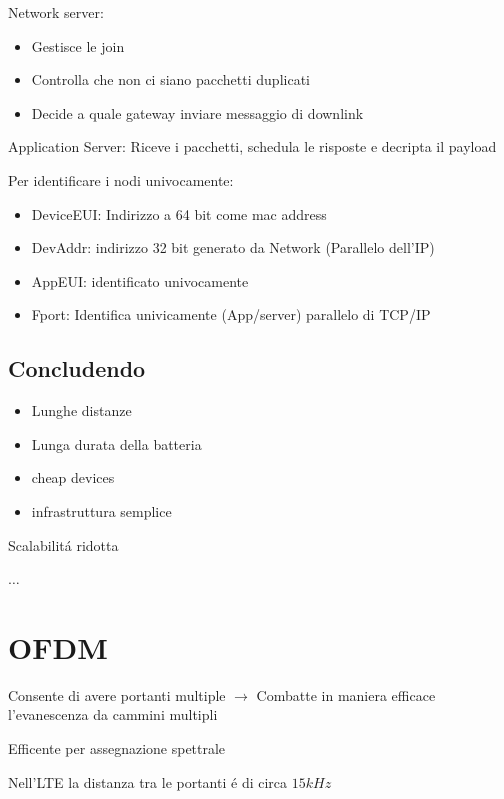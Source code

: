 \documentclass{article}
\begin{document}
Network server:
\begin{itemize}
    \item Gestisce le join
    \item Controlla che non ci siano pacchetti duplicati
    \item Decide a quale gateway inviare messaggio di downlink
\end{itemize}

Application Server: Riceve i pacchetti, schedula le risposte e decripta il payload

Per identificare i nodi univocamente:
\begin{itemize}
    \item DeviceEUI: Indirizzo a 64 bit come mac address
    \item DevAddr: indirizzo 32 bit generato da Network (Parallelo dell'IP)
    \item AppEUI: identificato univocamente
    \item Fport: Identifica univicamente (App/server) parallelo di TCP/IP
\end{itemize}


\subsection{Concludendo}

\begin{itemize}
    \item Lunghe distanze
    \item Lunga durata della batteria
    \item cheap devices
    \item infrastruttura semplice
\end{itemize}

Scalabilit\'a ridotta

$\ldots$

\section{OFDM}
Consente di avere portanti multiple $\rightarrow$ Combatte in maniera efficace l'evanescenza da cammini multipli

Efficente per assegnazione spettrale

Nell'LTE la distanza tra le portanti \'e di circa $15kHz$
\end{document}
